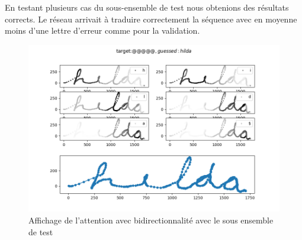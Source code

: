     En testant plusieurs cas du sous-ensemble de test nous obtenions des résultats corrects. Le réseau arrivait à traduire correctement la séquence avec en moyenne moins d'une lettre d'erreur comme pour la validation.
    \begin{figure}[!ht]
        \centering
        \includegraphics[width=120mm]{sections/images/interpretation/TEST_attention.png}
        \caption{Affichage de l'attention avec bidirectionnalité avec le sous ensemble de test}
        \label{fig:Figure 14  }
    \end{figure}